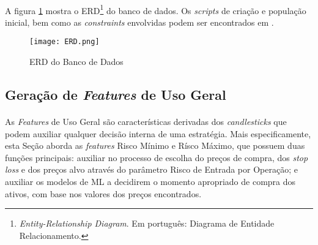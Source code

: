 
\paragraph{} A figura \ref{fig:103} mostra o ERD\footnote{\textit{Entity-Relationship Diagram}. Em português: Diagrama de Entidade Relacionamento.} do banco de dados. Os \textit{scripts} de criação e população inicial, bem como as \textit{constraints} envolvidas podem ser encontrados em \cite{github_db_schema}.

\begin{landscape}

\begin{figure}[!htb]
    \texttt{[image: ERD.png]}
    \centering
    \caption{ERD do Banco de Dados}
    \label{fig:103}
\end{figure}

\end{landscape}




\FloatBarrier
\subsection{Geração de \textit{Features} de Uso Geral}
\label{sub:features}

\paragraph{} As \textit{Features} de Uso Geral são características derivadas dos \textit{candlesticks} que podem auxiliar qualquer decisão interna de uma estratégia. Mais especificamente, esta Seção aborda as \textit{features} Risco Mínimo e Rísco Máximo, que possuem duas funções principais: auxiliar no processo de escolha do preços de compra, dos \textit{stop loss} e dos preços alvo através do parâmetro Risco de Entrada por Operação; e auxiliar os modelos de ML a decidirem o momento apropriado de compra dos ativos, com base nos valores dos preços encontrados.

